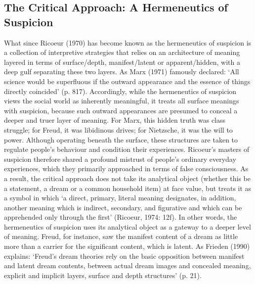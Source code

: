     \begin{adjmulticols}{2}{0mm}{0mm}
\chapter{The Critical Approach: A Hermeneutics of Suspicion}
What since Ricoeur (1970) has become known as the hermeneutics of suspicion is a collection of interpretive strategies that relies on an architecture of meaning layered in terms of surface/depth, manifest/latent or apparent/hidden, with a deep gulf separating these two layers. As Marx (1971) famously declared: ‘All science would be superfluous if the outward appearance and the essence of things directly coincided’ (p. 817). Accordingly, while the hermeneutics of suspicion views the social world as inherently meaningful, it treats all surface meanings with suspicion, because such outward appearances are presumed to conceal a deeper and truer layer of meaning. For Marx, this hidden truth was class struggle; for Freud, it was libidinous drives; for Nietzsche, it was the will to power. Although operating beneath the surface, these structures are taken to regulate people’s behaviour and condition their experiences. Ricoeur’s masters of suspicion therefore shared a profound mistrust of people’s ordinary everyday experiences, which they primarily approached in terms of false consciousness. As a result, the critical approach does not take its analytical object (whether this be a statement, a dream or a common household item) at face value, but treats it as a symbol in which ‘a direct, primary, literal meaning designates, in addition, another meaning which is indirect, secondary, and figurative and which can be apprehended only through the first’ (Ricoeur, 1974: 12f). In other words, the hermeneutics of suspicion uses its analytical object as a gateway to a deeper level of meaning. Freud, for instance, saw the manifest content of a dream as little more than a carrier for the significant content, which is latent. As Frieden (1990) explains: ‘Freud’s dream theories rely on the basic opposition between manifest and latent dream contents, between actual dream images and concealed meaning, explicit and implicit layers, surface and depth structures’ (p. 21).


\end{adjmulticols}
